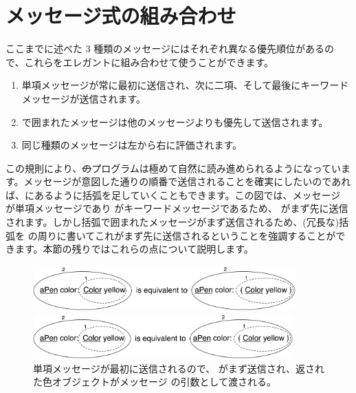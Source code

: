 \documentclass[a4paper,10pt,twoside]{book}
\begin{document}

\section{メッセージ式の組み合わせ}
ここまでに述べた 3 種類のメッセージにはそれぞれ異なる優先順位があるので、これらをエレガントに組み合わせて使うことができます。

\begin{enumerate}
\item 単項メッセージが常に最初に送信され、次に二項、そして最後にキーワードメッセージが送信されます。
\item {}で囲まれたメッセージは他のメッセージよりも優先して送信されます。
\item 同じ種類のメッセージは左から右に評価されます。
\end{enumerate}

この規則により、\st のプログラムは極めて自然に読み進められるようになっています。メッセージが意図した通りの順番で送信されることを確実にしたいのであれば、にあるように括弧を足していくこともできます。この図では、メッセージ  が単項メッセージであり  がキーワードメッセージであるため、 がまず先に送信されます。しかし括弧で囲まれたメッセージがまず送信されるため、(冗長な)括弧を  の周りに書いてこれがまず先に送信されるということを強調することができます。本節の残りではこれらの点について説明します。

\begin{figure}[ht]
\ifluluelse
	{\centerline{\includegraphics[width=0.9\textwidth]{uKeyUn}} }
	{\centerline{\includegraphics[width=10cm]{uKeyUn}} }
\caption{単項メッセージが最初に送信されるので、 がまず送信され、返された色オブジェクトがメッセージ  の引数として渡される。}
\end{figure}
\end{document}
